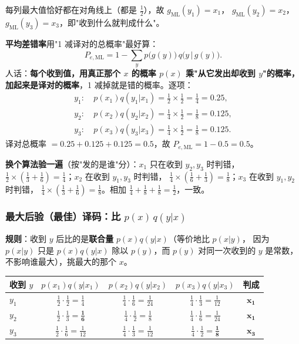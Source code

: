 每列最大值恰好都在对角线上（都是 $\frac12$），故 $g_{\mathrm{ML}}(y_1)=x_1$，
$g_{\mathrm{ML}}(y_2)=x_2$，$g_{\mathrm{ML}}(y_3)=x_3$，即"收到什么就判成什么"。

\textbf{平均差错率}用"1 减译对的总概率"最好算：
\[
P_{e,\mathrm{ML}}=1-\sum_{y}p\bigl(g(y)\bigr)\,q\bigl(y\,|\,g(y)\bigr).
\]
人话：\textbf{每个收到值，用真正那个 $x$ 的概率 $p(x)$ 乘"从它发出却收到 $y$"的概率，
加起来是译对的概率}，1 减掉就是错的概率。逐项：
\begin{align*}
y_1:\ & p(x_1)q(y_1|x_1)=\tfrac12\times\tfrac12=\tfrac14=0.25,\\
y_2:\ & p(x_2)q(y_2|x_2)=\tfrac14\times\tfrac12=\tfrac18=0.125,\\
y_3:\ & p(x_3)q(y_3|x_3)=\tfrac14\times\tfrac12=\tfrac18=0.125 .
\end{align*}
译对总概率 $=0.25+0.125+0.125=0.5$，故 $P_{e,\mathrm{ML}}=1-0.5=\boxed{0.5}$。

\textbf{换个算法验一遍}（按"发的是谁"分）：$x_1$ 只在收到 $y_2,y_3$ 时判错，
$\frac12\times(\frac13+\frac16)=\frac14$；$x_2$ 在收到 $y_1,y_3$ 时判错，
$\frac14\times(\frac16+\frac13)=\frac18$；$x_3$ 在收到 $y_1,y_2$ 时判错，
$\frac14\times(\frac13+\frac16)=\frac18$。相加 $\frac14+\frac18+\frac18=\frac12$，一致。

\subsubsection{最大后验（最佳）译码：比 $p(x)\,q(y|x)$}

\textbf{规则}：收到 $y$ 后比的是\textbf{联合量} $p(x)q(y|x)$（等价地比 $p(x|y)$，
因为 $p(x|y)$ 只是 $p(x)q(y|x)$ 除以 $p(y)$，而 $p(y)$ 对同一次收到的 $y$ 是常数，
不影响谁最大），挑最大的那个 $x$。

\begin{center}\small
\setlength{\tabcolsep}{5pt}
\begin{tabular}{@{}lcccc@{}}
\toprule
收到 $y$ & $p(x_1)q(y|x_1)$ & $p(x_2)q(y|x_2)$ & $p(x_3)q(y|x_3)$ & 判成\\
\midrule
$y_1$ & $\tfrac12\cdot\tfrac12=\tfrac14$ & $\tfrac14\cdot\tfrac16=\tfrac1{24}$ & $\tfrac14\cdot\tfrac13=\tfrac1{12}$ & $\mathbf{x_1}$\\
$y_2$ & $\tfrac12\cdot\tfrac13=\mathbf{\tfrac16}$ & $\tfrac14\cdot\tfrac12=\tfrac18$ & $\tfrac14\cdot\tfrac16=\tfrac1{24}$ & $\mathbf{x_1}$\\
$y_3$ & $\tfrac12\cdot\tfrac16=\tfrac1{12}$ & $\tfrac14\cdot\tfrac13=\tfrac1{12}$ & $\tfrac14\cdot\tfrac12=\mathbf{\tfrac18}$ & $\mathbf{x_3}$\\
\bottomrule
\end{tabular}
\end{center}

